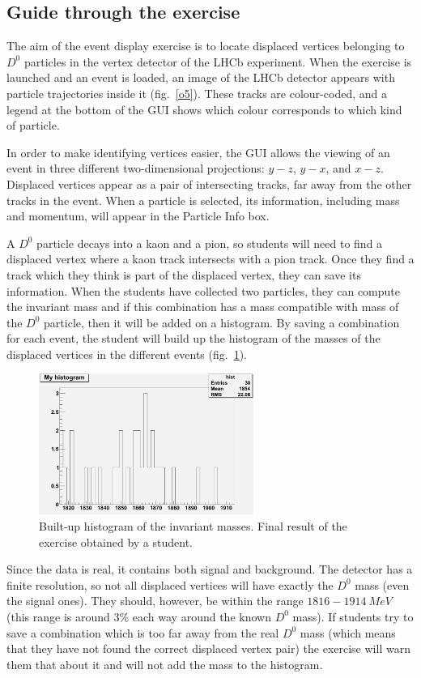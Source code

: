 \documentclass[3p,times,twocolumn]{elsarticle}
\begin{document}
\subsection{Guide through the exercise}
The aim of the event display exercise is to locate displaced vertices belonging to $D^0$ particles in the vertex detector of the LHCb experiment. When the exercise is launched and an event is loaded, an image of the LHCb detector appears with particle trajectories inside it (fig.~\ref{o5}). These tracks are colour-coded, and a legend at the bottom of the GUI shows which colour corresponds to which kind of particle.

In order to make identifying vertices easier, the GUI allows the viewing of an event in three different two-dimensional projections: $y-z$, $y-x$, and $x-z$. Displaced vertices appear as a pair of intersecting tracks, far away from the other tracks in the event. When a particle is selected, its information, including mass and momentum, will appear in the Particle Info box.\par
A $D^0$ particle decays into a kaon and a pion, so students will need to find a displaced vertex where a kaon track intersects with a pion track. Once they find a track which they think is part of the displaced vertex, they can save its information. When the students have collected two particles, they can compute the invariant mass and if this combination has a mass compatible with mass of the $D^0$ particle, then it will be added on a histogram. By saving a combination for each event, the student will build up the histogram of the masses of the displaced vertices in the different events (fig.~\ref{o8}).\par
\begin{figure}[ht!]
	\centering
	\includegraphics[width=70mm]{2198k7c.png}
	\caption{Built-up histogram of the invariant masses. Final result of the exercise obtained by a student. \label{o8}}
\end{figure}
Since the data is real, it contains both signal and background. The detector has a finite resolution, so not all displaced vertices will have exactly the $D^0$ mass (even the signal ones). They should, however, be within the range $1816-1914 ~MeV$ (this range is around $3\%$ each way around the known $D^0$ mass). If students try to save a combination which is too far away from the real $D^0$ mass (which means that they have not found the correct displaced vertex pair) the exercise will warn them that about it and will not add the mass to the histogram.
\end{document}
